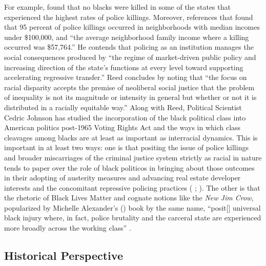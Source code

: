\documentclass[12pt]{article}
\begin{document}
For example, \textcite{reedHowRacialDisparity2016} found that no blacks were killed in some of the states that experienced the highest rates of police killings. Moreover, \textcite{reedHowRacialDisparity2016} references that \parencite{jilani95PoliceKillings2015} found that 95 percent of police killings occurred in neighborhoods with median incomes under \$100,000, and “the average neighborhood family income where a killing occurred was \$57,764.” He contends that policing as an institution manages the social consequences produced by “the regime of market-driven public policy and increasing direction of the state’s functions at every level toward supporting accelerating regressive transfer.” Reed concludes by noting that “the focus on racial disparity accepts the premise of neoliberal social justice that the problem of inequality is not its magnitude or intensity in general but whether or not it is distributed in a racially equitable way.” Along with Reed, Political Scientist Cedric Johnson has studied the incorporation of the black political class into American politics post-1965 Voting Rights Act and the ways in which class cleavages among blacks are at least as important as interracial dynamics. This is important in at least two ways: one is that positing the issue of police killings and broader miscarriages of the criminal justice system strictly as racial in nature tends to paper over the role of black politicos in bringing about those outcomes in their adopting of austerity measures and advancing real estate developer interests and the concomitant repressive policing practices (\citeauthor{johnsonAfterwordBaltimorePolicing2016} \citeyear[305]{johnsonAfterwordBaltimorePolicing2016}; \citeyear[179]{johnsonTrumpismPolicingProblem2019}). The other is that the rhetoric of Black Lives Matter and cognate notions like the \textit{New Jim Crow}, popularized by Michelle Alexander’s (\citeyear{alexanderNewJimCrow2010}) book by the same name, “posit[] universal black injury where, in fact, police brutality and the carceral state are experienced more broadly across the working class” \parencite*[317]{johnsonAfterwordBaltimorePolicing2016}.

\subsection{Historical Perspective}\
\end{document}
